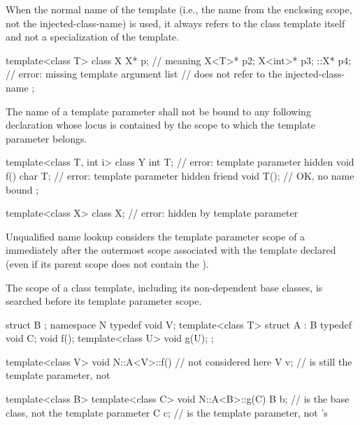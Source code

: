 \pnum
When the normal name of the template (i.e., the name from
the enclosing scope, not the injected-class-name) is
used,
it always refers to the class template itself and not a
specialization of the template.
\begin{example}
\begin{codeblock}
template<class T> class X {
  X* p;                                 // meaning 
  X<T>* p2;
  X<int>* p3;
  ::X* p4;                              // error: missing template argument list
                                        //  does not refer to the injected-class-name
};
\end{codeblock}
\end{example}

\pnum
The name of a template parameter
shall not be bound to any following declaration
whose locus is contained by the scope
to which the template parameter belongs.
\begin{example}
\begin{codeblock}
template<class T, int i> class Y {
  int T;                                // error: template parameter hidden
  void f() {
    char T;                             // error: template parameter hidden
  }
  friend void T();                      // OK, no name bound
};

template<class X> class X;              // error: hidden by template parameter
\end{codeblock}
\end{example}

\pnum
Unqualified name lookup considers
the template parameter scope of a 
immediately after the outermost scope associated with the template declared
(even if its parent scope does not contain
the ).
\begin{note}
The scope of a class template,
including its non-dependent base classes,
is searched before its template parameter scope.
\end{note}
\begin{example}
\begin{codeblock}
struct B { };
namespace N {
  typedef void V;
  template<class T> struct A : B {
    typedef void C;
    void f();
    template<class U> void g(U);
  };
}

template<class V> void N::A<V>::f() {   //  not considered here
  V v;                                  //  is still the template parameter, not 
}

template<class B> template<class C> void N::A<B>::g(C) {
  B b;                                  //  is the base class, not the template parameter
  C c;                                  //  is the template parameter, not 's 
}
\end{codeblock}
\end{example}

